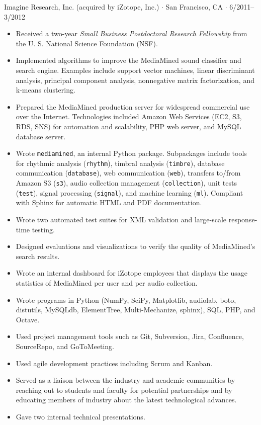 \documentclass[10pt,letterpaper]{article}
\begin{document}
Imagine Research, Inc. (acquired by iZotope, Inc.) $\cdot$ San Francisco, CA $\cdot$ 6/2011--3/2012
\begin{itemize}
    \item Received a two-year \textit{Small Business Postdoctoral Research Fellowship} from the U. S. National Science Foundation (NSF).
    \item Implemented algorithms to improve the MediaMined sound classifier and search engine. Examples include support vector machines, linear discriminant analysis, principal component analysis, nonnegative matrix factorization, and k-means clustering.
    \item Prepared the MediaMined production server for widespread commercial use over the Internet. Technologies included Amazon Web Services (EC2, S3, RDS, SNS) for automation and scalability, PHP web server, and MySQL database server.
    \item Wrote \texttt{mediamined}, an internal Python package. Subpackages include tools for rhythmic analysis (\texttt{rhythm}), timbral analysis (\texttt{timbre}), database communication (\texttt{database}), web communication (\texttt{web}), transfers to/from Amazon S3 (\texttt{s3}), audio collection management (\texttt{collection}), unit tests (\texttt{test}), signal processing (\texttt{signal}), and machine learning (\texttt{ml}). Compliant with Sphinx for automatic HTML and PDF documentation.
    \item Wrote two automated test suites for XML validation and large-scale response-time testing.
    \item Designed evaluations and visualizations to verify the quality of MediaMined's search results.
    \item Wrote an internal dashboard for iZotope employees that displays the usage statistics of MediaMined per user and per audio collection.
    \item Wrote programs in Python (NumPy, SciPy, Matplotlib, audiolab, boto, distutils, MySQLdb, ElementTree, Multi-Mechanize, sphinx), SQL, PHP, and Octave.
    \item Used project management tools such as Git, Subversion, Jira, Confluence, SourceRepo, and GoToMeeting.
    \item Used agile development practices including Scrum and Kanban.
    \item Served as a liaison between the industry and academic communities by reaching out to students and faculty for potential partnerships and by educating members of industry about the latest technological advances.
    \item Gave two internal technical presentations.
\end{itemize}
\end{document}
